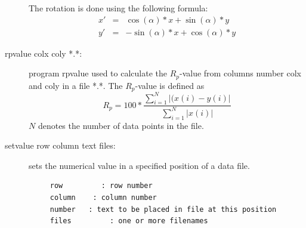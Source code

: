 \begin{description}
 The rotation is done using the following formula:
\begin{eqnarray}
 x'&= &\cos(\alpha)*x+\sin(\alpha)*y \nonumber \\
 y'&=&-\sin(\alpha)*x+\cos(\alpha)*y
\end{eqnarray}
\item [\prg rpvalue\index{rpvalue} colx coly  *.*:]  program rpvalue  used to %
calculate 
                       the $R_p$-value from columns number colx and coly 
		       in a file *.*. The $R_p$-value is defined as
		       \begin{equation}
		       R_p= 100*\frac{\sum_{i=1}^{N} |(x(i)-y(i)|}{\sum_{i=1}^{N}|x(i)|}
		       \end{equation}
                       $N$ denotes the number of data points in the file.
\item [\prg setvalue\index{setvalue} row column text files:] sets the numerical value in a specified position of a data file.

\begin{verbatim}
     row         : row number
     column    : column number
     number   : text to be placed in file at this position
     files         : one or more filenames


\end{verbatim}
\end{description}
